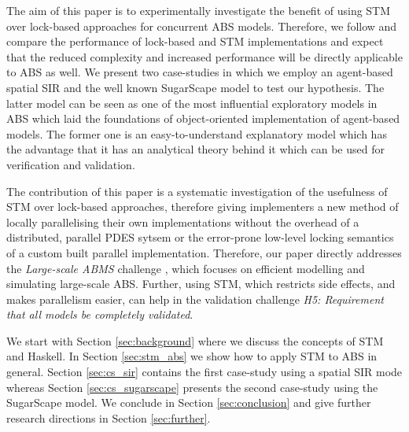 \medskip

The aim of this paper is to experimentally investigate the benefit of using STM over lock-based approaches for concurrent ABS models. Therefore, we follow \cite{discolo_lock_2006} and compare the performance of lock-based and STM implementations and expect that the reduced complexity and increased performance will be directly applicable to ABS as well. We present two case-studies in which we employ an agent-based spatial SIR \citep{macal_agent-based_2010, thaler_pure_2018} and the well known SugarScape \citep{epstein_growing_1996} model to test our hypothesis. The latter model can be seen as one of the most influential exploratory models in ABS which laid the foundations of object-oriented implementation of agent-based models. The former one is an easy-to-understand explanatory model which has the advantage that it has an analytical theory behind it which can be used for verification and validation. 

The contribution of this paper is a systematic investigation of the usefulness of STM over lock-based approaches, therefore giving implementers a new method of locally parallelising their own implementations without the overhead of a distributed, parallel PDES sytsem or the error-prone low-level locking semantics of a custom built parallel implementation. Therefore, our paper directly addresses the \textit{Large-scale ABMS} challenge \cite{macal_everything_2016}, which focuses on efficient modelling and simulating large-scale ABS. Further, using STM, which restricts side effects, and makes parallelism easier, can help in the validation challenge \cite{macal_everything_2016} \emph{H5: Requirement that all models be completely validated}.

We start with Section \ref{sec:background} where we discuss the concepts of STM and Haskell. In Section \ref{sec:stm_abs} we show how to apply STM to ABS in general. Section \ref{sec:cs_sir} contains the first case-study using a spatial SIR mode whereas Section \ref{sec:cs_sugarscape} presents the second case-study using the SugarScape model. We conclude in Section \ref{sec:conclusion} and give further research directions in Section \ref{sec:further}.